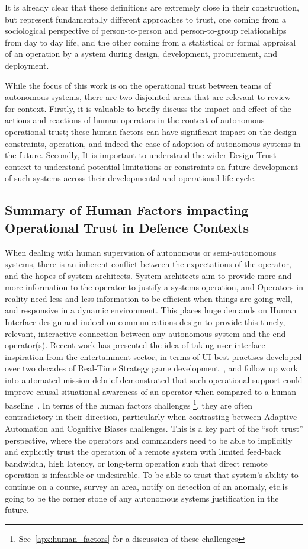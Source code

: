 It is already clear that these definitions are extremely close in their construction, but represent fundamentally different approaches to trust, one coming from a sociological perspective of person-to-person and person-to-group relationships from day to day life, and the other coming from a statistical or formal appraisal of an operation by a system during design, development, procurement, and deployment.

While the focus of this work is on the operational trust between teams of autonomous systems, there are two disjointed areas that are relevant to review for context.
Firstly, it is valuable to briefly discuss the impact and effect of the actions and reactions of human operators in the context of autonomous operational trust; these human factors can have significant impact on the design constraints, operation, and indeed the ease-of-adoption of autonomous systems in the future. 
Secondly, It is important to understand the wider Design Trust context to understand potential limitations or constraints on future development of such systems across their developmental and operational life-cycle.

\subsection{Summary of Human Factors impacting Operational Trust in Defence Contexts}

When dealing with human supervision of autonomous or semi-autonomous systems, there is an inherent conflict between the expectations of the operator, and the hopes of system architects.
System architects aim to provide more and more information to the operator to justify a systems operation, and Operators in reality need less and less information to be efficient when things are going well, and responsive in a dynamic environment.
This places huge demands on Human Interface design and indeed on communications design to provide this timely, relevant, interactive connection between any autonomous system and the end operator(s).
Recent work has presented the idea of taking user interface inspiration from the entertainment sector, in terms of UI best practises developed over two decades of Real-Time Strategy game development~\cite{Johnson2007}, and follow up work into automated mission debrief demonstrated that such operational support could improve causal situational awareness of an operator when compared to a human-baseline~\cite{Johnson2011}.
In terms of the human factors challenges \footnote{See~\autoref{apx:human_factors} for a discussion of these challenges}, they are often contradictory in their direction, particularly when contrasting between Adaptive Automation and Cognitive Biases challenges.
This is a key part of the ``soft trust'' perspective, where the operators and commanders need to be able to implicitly and explicitly trust the operation of a remote system with limited feed-back bandwidth, high latency, or long-term operation such that direct remote operation is infeasible or undesirable.
To be able to trust that system's ability to continue on a course, survey an area, notify on detection of an anomaly, etc.is going to be the corner stone of any autonomous systems justification in the future.

